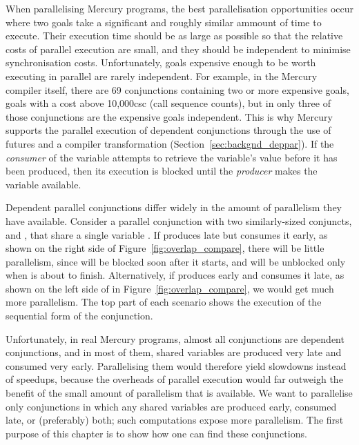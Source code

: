 When parallelising Mercury programs,
the best parallelisation opportunities occur
where two goals take a significant and roughly similar ammount of time to
execute.
Their execution time should be as large as possible
so that the relative costs of parallel execution are small,
and they should be independent to minimise synchronisation costs.
Unfortunately, goals expensive enough to be worth executing in parallel
are rarely independent.
For example, in the Mercury compiler itself,
there are 69 conjunctions containing two or more expensive goals,
goals with a cost above 10,000csc (call sequence counts),
but in only three of those conjunctions are the expensive goals independent.
This is why Mercury supports the parallel execution of dependent conjunctions
through the use of futures and a compiler transformation
\citep{wang:2006:hons, wang:2011:dep-par} (Section~\ref{sec:backgnd_deppar}).
If the \emph{consumer} of the variable attempts to retrieve the variable's value
before it has been produced, then its execution is blocked
until the \emph{producer} makes the variable available.


Dependent parallel conjunctions differ widely
in the amount of parallelism they have available.
Consider a parallel conjunction with two similarly-sized conjuncts,
 and , that share a single variable .
If  produces  late but  consumes it early,
as shown on the right side of Figure~\ref{fig:overlap_compare},
there will be little parallelism,
since  will be blocked soon after it starts,
and will be unblocked only when  is about to finish.
Alternatively, if  produces  early
and  consumes it late,
as shown on the left side of in Figure~\ref{fig:overlap_compare},
we would get much more parallelism.
The top part of each scenario
shows the execution of the sequential form of the conjunction.

Unfortunately, in real Mercury programs,
almost all conjunctions are dependent conjunctions,
and in most of them,
shared variables are produced very late and consumed very early.
Parallelising them would therefore yield slowdowns instead of speedups,
because the overheads of parallel execution would far outweigh the
benefit of the small amount of parallelism that is available.
We want to parallelise only conjunctions
in which any shared variables are produced early, consumed late,
or (preferably) both;
such computations expose more parallelism.
The first purpose of this chapter is to show how one can find these conjunctions.


